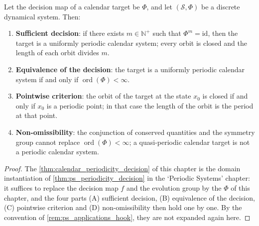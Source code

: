 \begin{theorem}\label{thm:calendar_periodicity_decision}
Let the decision map of a calendar target be \(\Phi\), and let \((\mathcal S,\Phi)\) be a discrete dynamical system. Then:
\begin{enumerate}[label=(\Alph*)]
    \item \textbf{Sufficient decision}: if there exists \(m\in\mathbb N^+\) such that \(\Phi^m=\mathrm{id}\), then the target is a uniformly periodic calendar system; every orbit is closed and the length of each orbit divides \(m\).
    \item \textbf{Equivalence of the decision}: the target is a uniformly periodic calendar system if and only if \(\operatorname{ord}(\Phi)<\infty\).
    \item \textbf{Pointwise criterion}: the orbit of the target at the state \(x_0\) is closed if and only if \(x_0\) is a periodic point; in that case the length of the orbit is the period at that point.
    \item \textbf{Non-omissibility}: the conjunction of conserved quantities and the symmetry group cannot replace \(\operatorname{ord}(\Phi)<\infty\); a quasi-periodic calendar target is not a periodic calendar system.
\end{enumerate}
\end{theorem}

\begin{proof}
The \cref{thm:calendar_periodicity_decision} of this chapter is the domain instantiation of \cref{thm:ps_periodicity_decision} in the `Periodic Systems' chapter:
it suffices to replace the decision map $f$ and the evolution group by the $\Phi$ of this chapter, and the four parts (A) sufficient decision, (B) equivalence of the decision, (C) pointwise criterion and
(D) non-omissibility then hold one by one. By the convention of \cref{rem:ps_applications_hook}, they are not expanded again here.
\end{proof}

